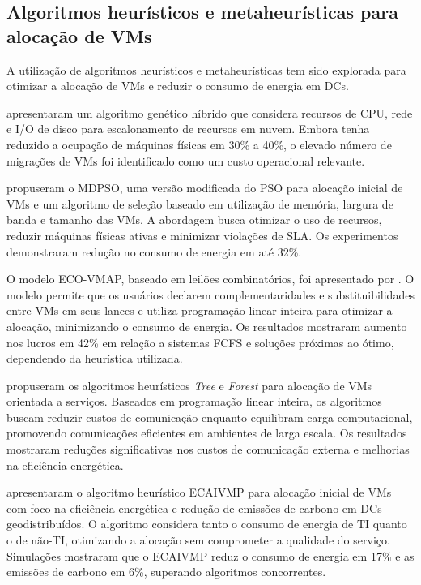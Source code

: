 \documentclass[
	12pt,				%
	oneside,			%
	a4paper,			%
	english,			%
	brazil				%
	]{abntex2ppgsi}
\begin{document}
\subsection{Algoritmos heurísticos e metaheurísticas para alocação de VMs}

A utilização de algoritmos heurísticos e metaheurísticas tem sido explorada para otimizar a alocação de VMs e reduzir o consumo de energia em DCs.

 apresentaram um algoritmo genético híbrido que considera recursos de CPU, rede e I/O de disco para escalonamento de recursos em nuvem. Embora tenha reduzido a ocupação de máquinas físicas em 30\% a 40\%, o elevado número de migrações de VMs foi identificado como um custo operacional relevante.

 propuseram o MDPSO, uma versão modificada do PSO para alocação inicial de VMs e um algoritmo de seleção baseado em utilização de memória, largura de banda e tamanho das VMs. A abordagem busca otimizar o uso de recursos, reduzir máquinas físicas ativas e minimizar violações de SLA. Os experimentos demonstraram redução no consumo de energia em até 32\%.

O modelo ECO-VMAP, baseado em leilões combinatórios, foi apresentado por . O modelo permite que os usuários declarem complementaridades e substituibilidades entre VMs em seus lances e utiliza programação linear inteira para otimizar a alocação, minimizando o consumo de energia. Os resultados mostraram aumento nos lucros em 42\% em relação a sistemas FCFS e soluções próximas ao ótimo, dependendo da heurística utilizada.

 propuseram os algoritmos heurísticos \textit{Tree} e \textit{Forest} para alocação de VMs orientada a serviços. Baseados em programação linear inteira, os algoritmos buscam reduzir custos de comunicação enquanto equilibram carga computacional, promovendo comunicações eficientes em ambientes de larga escala. Os resultados mostraram reduções significativas nos custos de comunicação externa e melhorias na eficiência energética.

 apresentaram o algoritmo heurístico ECAIVMP para alocação inicial de VMs com foco na eficiência energética e redução de emissões de carbono em DCs geodistribuídos. O algoritmo considera tanto o consumo de energia de TI quanto o de não-TI, otimizando a alocação sem comprometer a qualidade do serviço. Simulações mostraram que o ECAIVMP reduz o consumo de energia em 17\% e as emissões de carbono em 6\%, superando algoritmos concorrentes.
\end{document}
